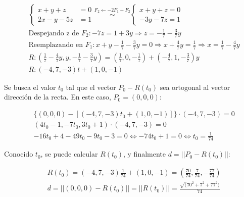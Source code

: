 \documentclass{article}
\begin{document}
\begin{subequations}
\begin{align}
& \left\{ \begin{array}{lr}
x + y + z &= 0 \\
2x - y - 5z &= 1
\end{array} \right. \overset{F_2 \leftarrow -2F_1 + F_2}{\sim} \left\{ \begin{array}{ll}
x + y + z = 0 \\
-3y -7z = 1
\end{array} \right. \\
& \text{Despejando z de } F_2: -7z = 1 + 3y \Rightarrow z = -\frac{1}{7} -\frac{3}{7} y \\
& \text{Reemplazando en } F_1: x + y - \frac{1}{7} -\frac{3}{7} y = 0 \Rightarrow x + \frac{4}{7} y = \frac{1}{7} \Rightarrow x = \frac{1}{7} -\frac{4}{7} y \\
& R: \left( \frac{1}{7} -\frac{4}{7}y, y, -\frac{1}{7} -\frac{3}{7} y \right) = \left( \frac{1}{7}, 0, -\frac{1}{7} \right) + \left( -\frac{4}{7}, 1, -\frac{3}{7} \right) y \\
& R: (-4, 7, -3) t + (1, 0, -1)
\end{align}
\end{subequations}

Se busca el valor $t_0$ tal que el vector $P_0 - R(t_0)$ sea ortogonal al vector dirección de la recta. En este caso, $P_0 = (0, 0, 0)$:

\begin{subequations}
\begin{align}
& \{(0, 0, 0) - [(-4, 7, -3) t_0 + (1, 0, -1)]\} \cdot (-4, 7, -3) = 0 \\
& (4 t_0 - 1, -7 t_0, 3 t_0 + 1) \cdot (-4, 7, -3) = 0 \\
& -16 t_0 + 4 -49 t_0 -9 t_0 -3 = 0 \Leftrightarrow -74 t_0 + 1 = 0 \Leftrightarrow t_0 = \frac{1}{74} 
\end{align}
\end{subequations}

Conocido $t_0$, se puede calcular $R(t_0)$, y finalmente $d = ||P_0 - R(t_0)||$:

\begin{subequations}
\begin{align}
& R(t_0) = (-4, 7, -3) \frac{1}{74} + (1, 0, -1) = \left( \frac{70}{74}, \frac{7}{74}, -\frac{77}{74} \right) \\
& d = ||(0,0,0) - R(t_0)|| = ||R(t_0)|| = \frac{\sqrt(70^2 + 7^2 + 77^2)}{74}
\end{align}
\end{subequations}
\end{document}
